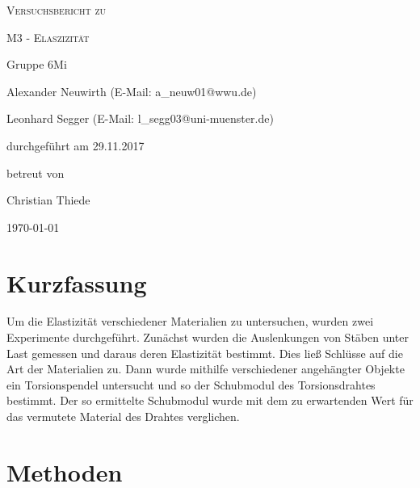 \documentclass[
	a4paper,
	12pt,
	pagesize,
	ngerman
]{scrartcl}
\begin{document}
	
	\begin{titlepage}
		\centering
		{\scshape\LARGE Versuchsbericht zu \par}
		\vspace{1cm}
		{\scshape\huge M3 - Elaszizität\par}
		\vspace{2.5cm}
		{\LARGE Gruppe 6Mi \par}
		\vspace{0.5cm}
		
		{\large Alexander Neuwirth (E-Mail: a\_neuw01@wwu.de) \par}
		{\large Leonhard Segger (E-Mail: l\_segg03@uni-muenster.de) \par}
		\vfill
		
		durchgeführt am 29.11.2017\par
		betreut von\par
		{\large Christian Thiede}
		
		\vfill
		
		{\large \today\par}
	\end{titlepage}
	\tableofcontents
	\newpage
	
	\section{Kurzfassung}
	Um die Elastizität verschiedener Materialien zu untersuchen, wurden zwei Experimente durchgeführt. Zunächst wurden die Auslenkungen von Stäben unter Last gemessen und daraus deren Elastizität bestimmt. Dies ließ Schlüsse auf die Art der Materialien zu. Dann wurde mithilfe verschiedener angehängter Objekte ein Torsionspendel untersucht und so der Schubmodul des Torsionsdrahtes bestimmt.  %
	Der so ermittelte Schubmodul wurde mit dem zu erwartenden Wert für das vermutete Material des Drahtes verglichen.
	\section{Methoden}
	
\end{document}
